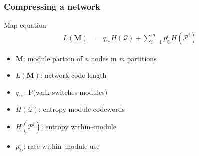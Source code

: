 \documentclass{beamer}
\begin{document}
\begin{frame}
  \frametitle{Compressing a network}

  \begin{block}{Map equation \tiny{}}
    \begin{align*}
      L(\textbf{M}) &= q_{\curvearrowright}H(\mathcal{Q}) + \sum^{m}_{i = 1} p^{i}_{\circlearrowright}H(\mathcal{P}^{i})
    \end{align*}

    \begin{itemize}
      \item \(\textbf{M}\): module partion of \textit{n} nodes in \textit{m} partitions
      \item \(L(\textbf{M})\): network code length 
      \item \(q_{\curvearrowright}\): P(walk switches modules)
      \item \(H(\mathcal{Q})\): entropy module codewords
      \item \(H(\mathcal{P}^{i})\): entropy within--module
      \item \(p^{i}_{\circlearrowright}\): rate within--module use
    \end{itemize}
  \end{block}
\end{frame}
\end{document}
